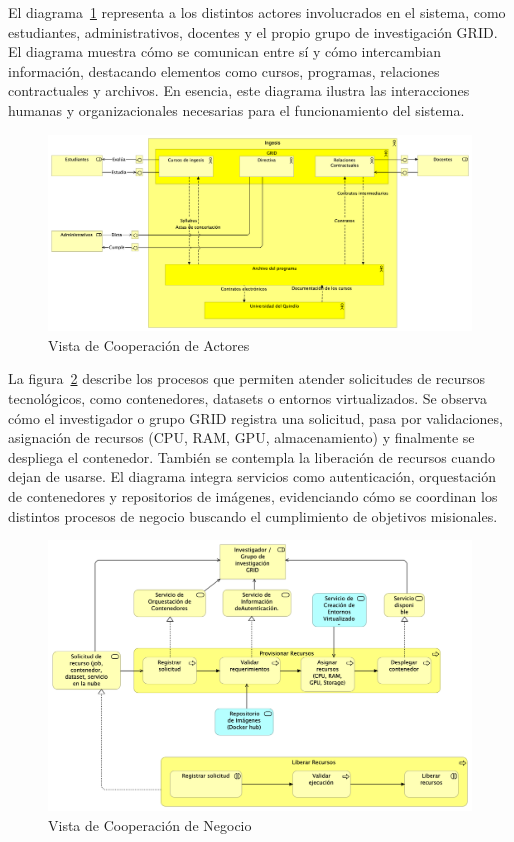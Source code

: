 El diagrama~\ref{fig:vista-cooperacion-actores} representa a los distintos actores involucrados en el sistema, como estudiantes, administrativos, docentes y el propio grupo de investigación GRID. El diagrama muestra cómo se comunican entre sí y cómo intercambian información, destacando elementos como cursos, programas, relaciones contractuales y archivos. En esencia, este diagrama ilustra las interacciones humanas y organizacionales necesarias para el funcionamiento del sistema.

\begin{figure}[H]
    \centering
    \includegraphics[width=\textwidth]{tablas-images/cp6/Actor-Cooperation-view.png}
    \caption{Vista de Cooperación de Actores}\label{fig:vista-cooperacion-actores}
\end{figure}

La figura~\ref{fig:vista-cooperacion-negocio} describe los procesos que permiten atender solicitudes de recursos tecnológicos, como contenedores, datasets o entornos virtualizados. Se observa cómo el investigador o grupo GRID registra una solicitud, pasa por validaciones, asignación de recursos (CPU, RAM, GPU, almacenamiento) y finalmente se despliega el contenedor. También se contempla la liberación de recursos cuando dejan de usarse. El diagrama integra servicios como autenticación, orquestación de contenedores y repositorios de imágenes, evidenciando cómo se coordinan los distintos procesos de negocio buscando el cumplimiento de objetivos misionales.

\begin{figure}[H]
    \centering
    \includegraphics[width=\textwidth]{tablas-images/cp6/Business-Cooperation-View.png}
    \caption{Vista de Cooperación de Negocio}\label{fig:vista-cooperacion-negocio}
\end{figure}

